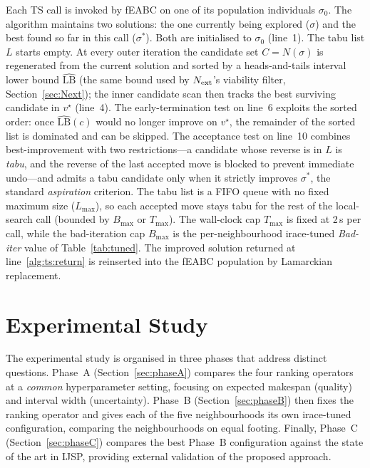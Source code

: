 \documentclass[preprint,12pt]{elsarticle}
\begin{document}
Each TS call is invoked by fEABC on one of its population individuals $\sigma_0$. The algorithm maintains two solutions: the one currently being explored ($\sigma$) and the best found so far in this call ($\sigma^{\ast}$). Both are initialised to $\sigma_0$ (line~1). The tabu list $L$ starts empty. At every outer iteration the candidate set $C = N(\sigma)$ is regenerated from the current solution and sorted by a heads-and-tails interval lower bound $\widehat{\text{LB}}$ (the same bound used by $N_{\rm ext}$'s viability filter, Section~\ref{sec:Next}); the inner candidate scan then tracks the best surviving candidate in $v^{\star}$ (line~4). The early-termination test on line~6 exploits the sorted order: once $\widehat{\text{LB}}(c)$ would no longer improve on $v^{\star}$, the remainder of the sorted list is dominated and can be skipped. The acceptance test on line~10 combines best-improvement with two restrictions---a candidate whose reverse is in $L$ is \emph{tabu}, and the reverse of the last accepted move is blocked to prevent immediate undo---and admits a tabu candidate only when it strictly improves $\sigma^{\ast}$, the standard \emph{aspiration} criterion. The tabu list is a FIFO queue with no fixed maximum size ($L_{\max}$), so each accepted move stays tabu for the rest of the local-search call (bounded by $B_{\max}$ or $T_{\max}$). The wall-clock cap $T_{\max}$ is fixed at 2\,s per call, while the bad-iteration cap $B_{\max}$ is the per-neighbourhood irace-tuned \emph{Bad-iter} value of Table~\ref{tab:tuned}. The improved solution returned at line~\ref{alg:ts:return} is reinserted into the fEABC population by Lamarckian replacement.


\section{Experimental Study}
\label{sec:experiments}

The experimental study is organised in three phases that address distinct questions. Phase~A (Section~\ref{sec:phaseA}) compares the four ranking operators at a \emph{common} hyperparameter setting, focusing on expected makespan (quality) and interval width (uncertainty). Phase~B (Section~\ref{sec:phaseB}) then fixes the ranking operator and gives each of the five neighbourhoods its own irace-tuned configuration, comparing the neighbourhoods on equal footing. Finally, Phase~C (Section~\ref{sec:phaseC}) compares the best Phase~B configuration against the state of the art in IJSP, providing external validation of the proposed approach.
\end{document}
